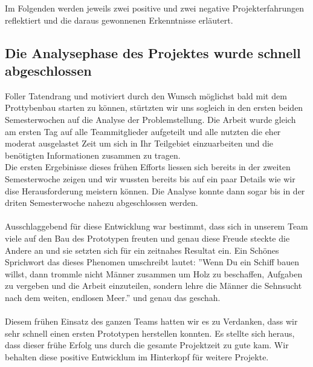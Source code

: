 Im  Folgenden werden jeweils zwei positive und zwei negative Projekterfahrungen reflektiert und die daraus gewonnenen Erkenntnisse erläutert.

\subsection{Die Analysephase des Projektes wurde schnell abgeschlossen}

Foller Tatendrang und motiviert durch den Wunsch möglichst bald mit dem Prottybenbau starten zu können, stürtzten wir uns sogleich in den ersten beiden Semesterwochen auf die Analyse der Problemstellung. Die Arbeit wurde gleich am ersten Tag auf alle Teammitglieder aufgeteilt und alle nutzten die eher moderat ausgelastet Zeit um sich in Ihr Teilgebiet einzuarbeiten und die benötigten Informationen zusammen zu tragen.\\
Die ersten Ergebinisse dieses frühen Efforts liessen sich bereits in der zweiten Semesterwoche zeigen und wir wussten bereits bis auf ein paar Details wie wir dise Herausforderung meistern können. Die Analyse konnte dann sogar bis in der driten Semesterwoche nahezu abgeschlossen werden.\\
\\
Ausschlaggebend für diese Entwicklung war bestimmt, dass sich in unserem Team viele auf den Bau des Prototypen freuten und genau diese Freude steckte die Andere an und sie setzten sich für ein zeitnahes Resultat ein. Ein Schönes Sprichwort das dieses Phenomen umschreibt lautet:  ''Wenn Du ein Schiff bauen willst, dann trommle nicht Männer zusammen um Holz zu beschaffen, Aufgaben zu vergeben und die Arbeit einzuteilen, sondern lehre die Männer die Sehnsucht nach dem weiten, endlosen Meer.'' \cite{SCHIFF} und genau das geschah.\\
\\
Diesem frühen Einsatz des ganzen Teams hatten wir es zu Verdanken, dass wir sehr schnell einen ersten Prototypen herstellen konnten. Es stellte sich heraus, dass dieser frühe Erfolg uns durch die gesamte Projektzeit zu gute kam. Wir behalten diese positive Entwicklum im Hinterkopf für weitere Projekte.
